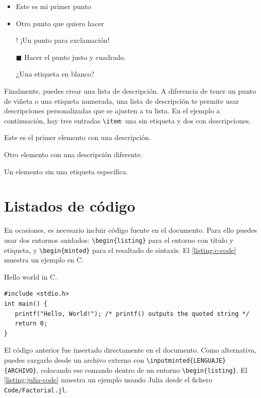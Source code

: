 \begin{itemize}
  \item Este es mi primer punto
  \item Otro punto que quiero hacer
  \item[!] ¡Un punto para exclamación!
  \item[$\blacksquare$] Hacer el punto justo y cuadrado.
  \item[] ¿Una etiqueta en blanco?
\end{itemize}

Finalmente, puedes crear una lista de descripción. A diferencia de tener un punto de viñeta o una etiqueta numerada, una lista de descripción te permite usar descripciones personalizadas que se ajusten a tu lista. En el ejemplo a continuación, hay tres entradas \verb|\item|: una sin etiqueta y dos con descripciones.

\begin{description}
    \item[Item 1:] Este es el primer elemento con una descripción.
    \item[Item 2:] Otro elemento con una descripción diferente.
    \item Un elemento sin una etiqueta específica.
\end{description}

\section{Listados de código}

En ocasiones, es necesario incluir código fuente en el documento. Para ello puedes usar dos entornos anidados: \verb|\begin{listing}| para el entorno con título y etiqueta, y \verb|\begin{minted}| para el resaltado de sintaxis. El \autoref{listing:c-code} muestra un ejemplo en C.

\begin{listing}[!htpb]
\caption{Hello world in C.}
\label{listing:c-code}
\begin{verbatim}
#include <stdio.h>
int main() {
   printf("Hello, World!"); /* printf() outputs the quoted string */
   return 0;
}
\end{verbatim}
\end{listing}

El código anterior fue insertado directamente en el documento. Como alternativa, puedes cargarlo desde un archivo externo con \verb|\inputminted{LENGUAJE}{ARCHIVO}|, colocando ese comando dentro de un entorno \verb|\begin{listing}|. El \autoref{listing:julia-code} muestra un ejemplo usando Julia desde el fichero \texttt{Code/Factorial.jl}.

